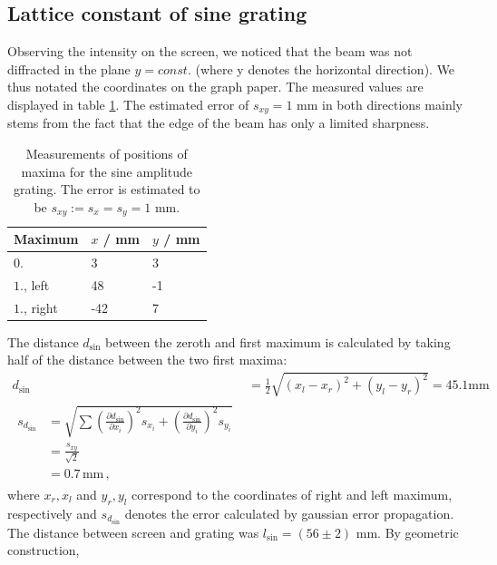 \subsection{Lattice constant of sine grating}
Observing the intensity on the screen, we noticed that the beam was not 
diffracted in the plane $y = const.$ (where y denotes the horizontal direction). 
We thus notated the coordinates on the graph paper. The measured values 
are displayed in table \ref{tab:sine_distances}. The estimated error of 
$s_{xy} = 1$ mm in both directions mainly stems from the fact that the edge of the beam 
has only a limited sharpness. 
\renewcommand{\arraystretch}{1.5}
\begin{table}[htdp]
    \centering
    \begin{tabular}{|p{6.18cm}|p{3.82cm}|p{3.82cm}|}
        \hline
        \rowcolor{tabcolor}
        Maximum & $x$ / mm & $y$  / mm \\ \hline
        $0.$        & 3     & 3\\
        $1.$, left & 48    & -1\\
        $1.$, right  & -42   & 7\\
        \hline
    \end{tabular}
    \caption{
        Measurements of positions of maxima for the sine amplitude grating. 
        The error is estimated to be $s_{xy} := s_x = s_y = 1$ mm. 
        }
    \label{tab:sine_distances}
\end{table}
The distance $d_\mathrm{sin}$ between the zeroth and first maximum is calculated by taking half of 
the distance between the two first maxima:
\begin{align}
    d_\mathrm{sin}   &= \frac{1}{2} \sqrt{(x_l - x_r)^2 + (y_l - y_r)^2} = 45.1 \mathrm{mm} \\
    \begin{split}
        s_{d_\mathrm{sin}} &= \sqrt{\sum{
                \left(\frac{\partial d_\mathrm{sin}}{\partial x_i}\right)^2 s_{x_i}  + 
                \left(\frac{\partial d_\mathrm{sin}}{\partial y_i}\right)^2 s_{y_i} 
                }} \\
        &= \frac{s_{xy}}{\sqrt{2}} \\
        &= 0.7 \, \mathrm{mm}\, ,
    \end{split}
\end{align}
where $x_r, x_l$ and $y_r, y_l$ correspond to the coordinates of right and left 
maximum, respectively and $s_{d_\mathrm{sin}}$ denotes the error calculated by gaussian error propagation.
The distance between screen and grating was $l_\mathrm{sin} = (56 \pm 2)$ mm. By geometric construction, 

